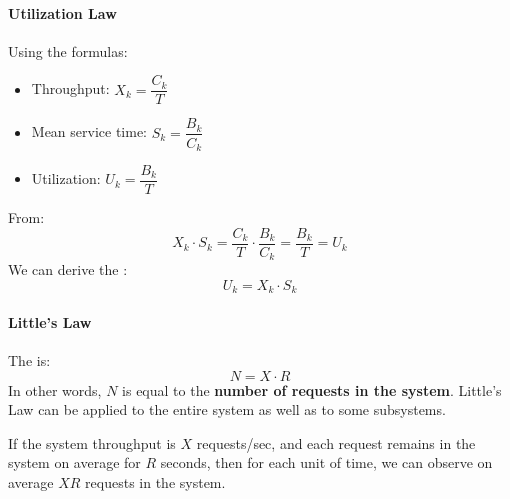\newpage

\paragraph{Utilization Law}

Using the formulas:
\begin{itemize}
	\item Throughput: $X_{k} = \dfrac{C_{k}}{T}$
	\item Mean service time: $S_{k} = \dfrac{B_{k}}{C_{k}}$
	\item Utilization: $U_{k} = \dfrac{B_{k}}{T}$
\end{itemize}
From:
\begin{equation*}
	X_{k} \cdot S_{k} = \dfrac{C_{k}}{T} \cdot \dfrac{B_{k}}{C_{k}} = \dfrac{B_{k}}{T} = U_{k}
\end{equation*}
We can derive the :
\begin{equation}
	U_{k} = X_{k} \cdot S_{k}
\end{equation}

\longline

\paragraph{Little's Law}

The  is:
\begin{equation}
	N = X \cdot R
\end{equation}
In other words, $N$ is equal to the \textbf{number of requests in the system}. Little's Law can be applied to the entire system as well as to some subsystems.

\highspace
If the system throughput is $X$ requests/sec, and each request remains in the system on average for $R$ seconds, then for each unit of time, we can observe on average $XR$ requests in the system.


